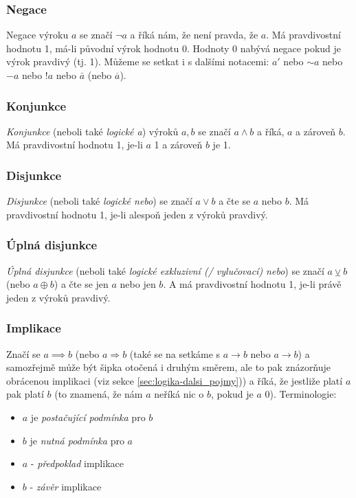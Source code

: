 \documentclass[12pt]{article}
\providecommand{\lxor}{\veebar}
\begin{document}
\subsubsection{Negace}
Negace výroku $a$ se značí $\neg a$ a říká nám, že není pravda, že $a$. Má pravdivostní hodnotu 1, má-li původní výrok hodnotu 0. Hodnoty 0 nabývá negace pokud je výrok pravdivý (tj. 1). Můžeme se setkat i s dalšími notacemi: $a'$ nebo $\sim a$ nebo $-a$ nebo $!a$ nebo $\bar{a}$ (nebo $\overline{a}$).
\subsubsection{Konjunkce}
\emph{Konjunkce} (neboli také \emph{logické a}) výroků $a,b$ se značí $a \land b$ a říká, $a$ a zároveň $b$. Má pravdivostní hodnotu 1, je-li $a$ 1 a zároveň $b$ je 1.
\subsubsection{Disjunkce}
\emph{Disjunkce} (neboli také \emph{logické nebo}) se značí $a \lor b$ a čte se $a$ nebo $b$. Má pravdivostní hodnotu 1, je-li alespoň jeden z výroků pravdivý.
\subsubsection{Úplná disjunkce}
\emph{Úplná disjunkce} (neboli také \emph{logické exkluzivní (/ vylučovací) nebo}) se značí $a \lxor b$ (nebo $a \oplus b$) a čte se jen $a$ nebo jen $b$. A má pravdivostní hodnotu 1, je-li právě jeden z výroků pravdivý.
\subsubsection{Implikace}
Značí se $ a \implies b$ (nebo $a \Rightarrow b$ (také se na setkáme s $a \rightarrow b$ nebo $a \longrightarrow b $) a samozřejmě může být šipka otočená i druhým směrem, ale to pak znázorňuje obrácenou implikaci (viz sekce \ref{sec:logika-dalsi_pojmy})) a říká, že jestliže platí $a$ pak platí $b$ (to znamená, že nám $a$ neříká nic o $b$, pokud je $a$ 0). Terminologie:
\begin{itemize}
\item $a$ je \emph{postačující podmínka} pro $b$
\item $b$ je \emph{nutná podmínka} pro $a$
\item $a$ - \emph{předpoklad} implikace
\item $b$ - \emph{závěr} implikace
\end{itemize}
\end{document}
